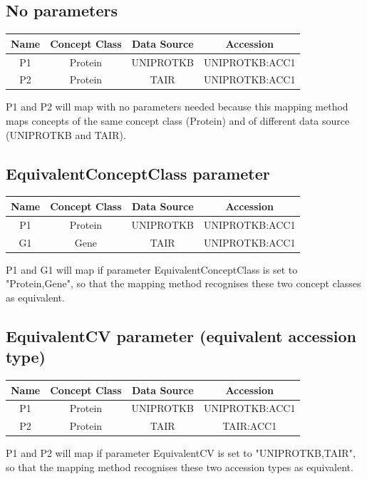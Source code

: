 \subsection{No parameters}
\begin{center}
\begin{tabular}{|c|c|c|c|}\hline
Name & Concept Class & Data Source & Accession\\ \hline			
P1 & Protein & UNIPROTKB & UNIPROTKB:ACC1\\
P2 & Protein & TAIR & UNIPROTKB:ACC1\\
\hline  
\end{tabular}
\end{center}
\vspace{0.5cm}
P1 and P2 will map with no parameters needed because this mapping method maps concepts of the same concept class (Protein) and of different data source (UNIPROTKB and TAIR).

\subsection{EquivalentConceptClass parameter}
\begin{center}
\begin{tabular}{|c|c|c|c|}\hline
Name & Concept Class & Data Source & Accession\\ \hline			
P1 & Protein & UNIPROTKB & UNIPROTKB:ACC1\\
G1 & Gene & TAIR & UNIPROTKB:ACC1\\
\hline  
\end{tabular}
\end{center}
\vspace{0.5cm}
P1 and G1 will map if parameter EquivalentConceptClass is set to "Protein,Gene", so that the mapping method recognises these two concept classes as equivalent.

\subsection{EquivalentCV parameter (equivalent accession type)}
\begin{center}
\begin{tabular}{|c|c|c|c|}\hline
Name & Concept Class & Data Source & Accession\\ \hline			
P1 & Protein & UNIPROTKB & UNIPROTKB:ACC1\\
P2 & Protein & TAIR & TAIR:ACC1\\
\hline  
\end{tabular}
\end{center}
\vspace{0.5cm}
P1 and P2 will map if parameter EquivalentCV is set to "UNIPROTKB,TAIR", so that the mapping method recognises these two accession types as equivalent.

